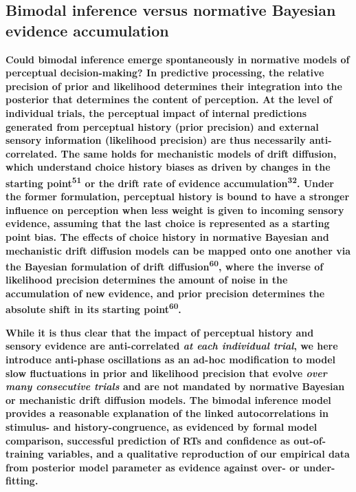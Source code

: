 \documentclass[
]{article}
\begin{document}
\hypertarget{bimodal-inference-versus-normative-bayesian-evidence-accumulation}{%
\subsection{Bimodal inference versus normative Bayesian evidence
accumulation}\label{bimodal-inference-versus-normative-bayesian-evidence-accumulation}}

\textbf{Could bimodal inference emerge spontaneously in normative models
of perceptual decision-making? In predictive processing, the relative
precision of prior and likelihood determines their integration into the
posterior that determines the content of perception. At the level of
individual trials, the perceptual impact of internal predictions
generated from perceptual history (prior precision) and external sensory
information (likelihood precision) are thus necessarily anti-correlated.
The same holds for mechanistic models of drift diffusion, which
understand choice history biases as driven by changes in the starting
point\textsuperscript{51} or the drift rate of evidence
accumulation\textsuperscript{32}. Under the former formulation,
perceptual history is bound to have a stronger influence on perception
when less weight is given to incoming sensory evidence, assuming that
the last choice is represented as a starting point bias. The effects of
choice history in normative Bayesian and mechanistic drift diffusion
models can be mapped onto one another via the Bayesian formulation of
drift diffusion\textsuperscript{60}, where the inverse of likelihood
precision determines the amount of noise in the accumulation of new
evidence, and prior precision determines the absolute shift in its
starting point\textsuperscript{60}.}

\textbf{While it is thus clear that the impact of perceptual history and
sensory evidence are anti-correlated \emph{at each individual trial}, we
here introduce anti-phase oscillations as an ad-hoc modification to
model slow fluctuations in prior and likelihood precision that evolve
\emph{over many consecutive trials} and are not mandated by normative
Bayesian or mechanistic drift diffusion models. The bimodal inference
model provides a reasonable explanation of the linked autocorrelations
in stimulus- and history-congruence, as evidenced by formal model
comparison, successful prediction of RTs and confidence as
out-of-training variables, and a qualitative reproduction of our
empirical data from posterior model parameter as evidence against over-
or under-fitting.}
\end{document}
